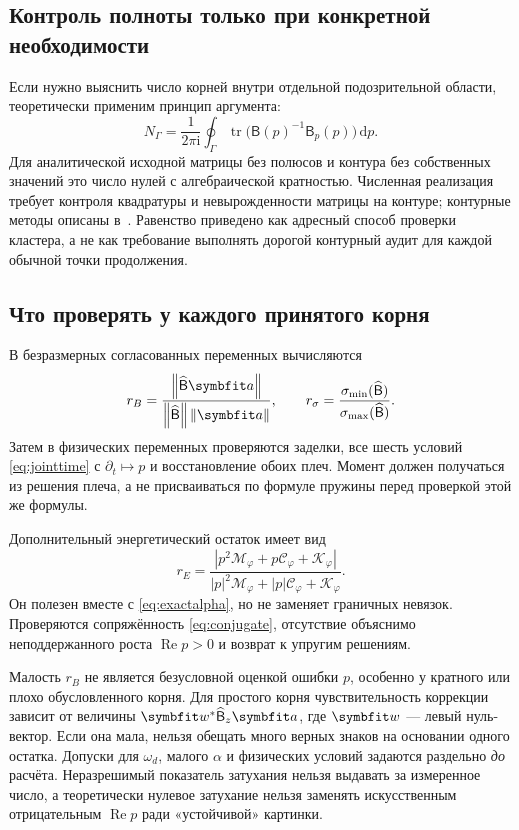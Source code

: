 \documentclass[11pt,a4paper]{article}
\numberwithin{equation}{section}
\newcommand{\dd}{\,\mathrm d}
\newcommand{\ii}{\mathrm i}
\newcommand{\BB}{\mathsf B}
\newcommand{\norm}[1]{\left\lVert#1\right\rVert}
\DeclareMathOperator{\tr}{tr}
\begin{document}
\subsection{Контроль полноты только при конкретной необходимости}

Если нужно выяснить число корней внутри отдельной подозрительной области,
теоретически применим принцип аргумента:
\begin{equation}
 N_\Gamma=\frac{1}{2\pi\ii}\oint_\Gamma
 \tr\bigl(\BB(p)^{-1}\BB_p(p)\bigr)\dd p.
 \label{eq:argument}
\end{equation}
Для аналитической исходной матрицы без полюсов и контура без собственных
значений это число нулей с алгебраической кратностью. Численная реализация
требует контроля квадратуры и невырожденности матрицы на контуре;
контурные методы описаны в~\cite{guettel2017}. Равенство приведено как
адресный способ проверки кластера, а не как требование выполнять дорогой
контурный аудит для каждой обычной точки продолжения.

\subsection{Что проверять у каждого принятого корня}

В безразмерных согласованных переменных вычисляются
\begin{equation}
 r_B=\frac{\norm{\widehat{\BB}\symbfit a}}
 {\norm{\widehat{\BB}}\norm{\symbfit a}},
 \qquad
 r_\sigma=\frac{\sigma_{\min}(\widehat{\BB})}
 {\sigma_{\max}(\widehat{\BB})}.
 \label{eq:residualB}
\end{equation}
Затем в физических переменных проверяются заделки, все шесть условий
\eqref{eq:jointtime} с $\partial_t\mapsto p$ и восстановление обоих плеч.
Момент должен получаться из решения плеча, а не присваиваться по формуле
пружины перед проверкой этой же формулы.

Дополнительный энергетический остаток имеет вид
\begin{equation}
 r_E=\frac{|p^2\mathcal M_\varphi+p\mathcal C_\varphi+\mathcal K_\varphi|}
 {|p|^2\mathcal M_\varphi+|p|\mathcal C_\varphi+\mathcal K_\varphi}.
 \label{eq:residualE}
\end{equation}
Он полезен вместе с \eqref{eq:exactalpha}, но не заменяет граничных невязок.
Проверяются сопряжённость \eqref{eq:conjugate}, отсутствие объяснимо
неподдержанного роста $\operatorname{Re}p>0$ и возврат к упругим решениям.

Малость $r_B$ не является безусловной оценкой ошибки $p$, особенно у
кратного или плохо обусловленного корня. Для простого корня чувствительность
коррекции зависит от величины
$\symbfit w^*\widehat{\BB}_z\symbfit a$, где $\symbfit w$
--- левый нуль-вектор. Если она мала, нельзя обещать много верных знаков
на основании одного остатка. Допуски для $\omega_d$, малого $\alpha$ и
физических условий задаются раздельно \emph{до} расчёта. Неразрешимый
показатель затухания нельзя выдавать за измеренное число, а теоретически
нулевое затухание нельзя заменять искусственным отрицательным
$\operatorname{Re}p$ ради «устойчивой» картинки.
\end{document}
